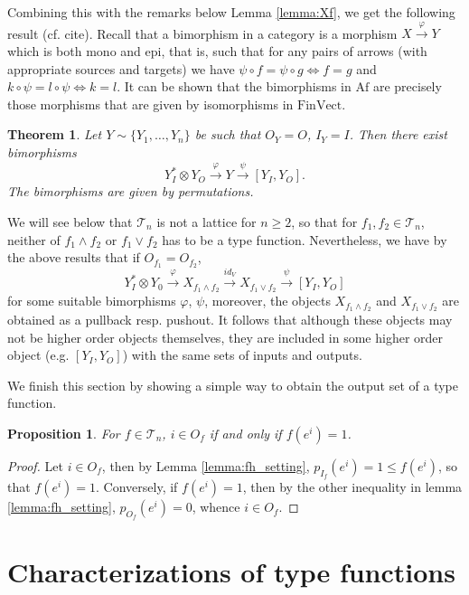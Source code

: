 \documentclass[12pt]{article}
\newtheorem{theorem}{Theorem}
\newtheorem{prop}{Proposition}
\theoremstyle{definition}
\theoremstyle{remark}
\def\Te{\mathcal T}
\def \Af{\mathrm{Af}}
\def \FV{\mathrm{FinVect}}
\begin{document}
Combining this with the remarks below Lemma \ref{lemma:Xf}, we get the following result
(cf. cite). Recall that a bimorphism in a category is a morphism $X\xrightarrow{\varphi} Y$ which is
both mono and epi, that is, such that
for any pairs of arrows (with appropriate sources and targets) we have $\psi\circ
f=\psi\circ g \iff f=g$ and $k\circ\psi=l\circ\psi \iff k=l$.  It can be shown that the
bimorphisms in $\Af$ are precisely those morphisms that are given by isomorphisms in
$\FV$.


\begin{theorem}\label{thm:setting} Let $Y\sim \{Y_1,\dots, Y_n\}$ be such that $O_Y=O$,
$I_Y=I$. Then there exist bimorphisms 
\[
Y_I^*\otimes Y_O\xrightarrow{\varphi} Y
\xrightarrow{\psi} [Y_I, Y_O].
\]
The bimorphisms are given by permutations. 


\end{theorem}


We will see below that $\Te_n$ is not a lattice for $n\ge 2$, so that for $f_1,f_2\in
\Te_n$, neither of $f_1\wedge f_2$ or $f_1\vee f_2$ has to be a type function.
Nevertheless, we have by the above results that if $O_{f_1}=O_{f_2}$, 
\[
Y_I^*\otimes Y_0 \xrightarrow{\varphi} X_{f_1\wedge f_2}\xrightarrow{id_V} X_{f_1\vee f_2}
\xrightarrow{\psi} [Y_I,Y_O]
\]
for some suitable bimorphisms $\varphi$, $\psi$, moreover, the objects $X_{f_1\wedge f_2}$
and $X_{f_1\vee f_2}$ are obtained as a pullback resp. pushout. It follows that although
these objects may  not be  higher order objects themselves, they are included in some higher order object (e.g.
 $[Y_I,Y_O]$) with the same sets of inputs and outputs. 



We finish this section by showing a simple  way to obtain the output set of a type
function.

\begin{prop}\label{prop:fh_outputs} For $f\in \Te_n$, $i\in O_f$ if and only if $f(e^i)=1$.


\end{prop}


\begin{proof} Let $i\in O_f$, then by Lemma \ref{lemma:fh_setting}, $p_{I_f}(e^i)=1\le
f(e^i)$, so that $f(e^i)=1$. Conversely, if $f(e^i)=1$, then by the other inequality in
lemma \ref{lemma:fh_setting}, $p_{O_f}(e^i)=0$, whence $i\in O_f$.


\end{proof}


\section{Characterizations of type  functions}
\end{document}

